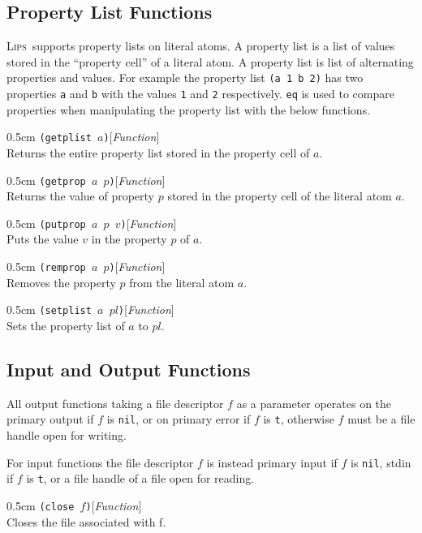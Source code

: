 \documentclass[a4paper]{article}
\newcommand{\lips}{\textsc{Lips}}
\newcommand{\lisp}[1]{\texttt{#1}}
\newcommand{\T}{\lisp{t}}
\newcommand{\NIL}{\lisp{nil}}
\newenvironment{defun}[2]{\begin{adjustwidth}{0.5cm}{}
    {\hspace*{-0.5cm}\lisp{#2}\hfill[\textit{#1}]\\}}
               {\end{adjustwidth}}
\begin{document}
\subsection{Property List Functions}
\lips\ supports property lists on literal atoms. A property list is a
list of values stored in the ``property cell'' of a literal atom. A
property list is list of alternating properties and values. For
example the property list \lisp{(a 1 b 2)} has two properties \lisp{a}
and \lisp{b} with the values \lisp{1} and \lisp{2}
respectively. \lisp{eq} is used to compare properties when
manipulating the property list with the below functions.

\begin{defun}{Function}{(getplist $a$)}
  Returns the entire property list stored in the property cell of $a$.
\end{defun}


\begin{defun}{Function}{(getprop $a$ $p$)}
  Returns the value of property $p$ stored in the property cell of the
  literal atom $a$.
\end{defun}

\begin{defun}{Function}{(putprop $a$ $p$ $v$)}
  Puts the value $v$ in the property $p$ of $a$.
\end{defun}

\begin{defun}{Function}{(remprop $a$ $p$)}
  Removes the property $p$ from the literal atom $a$.
\end{defun}

\begin{defun}{Function}{(setplist $a$ $pl$)}
  Sets the property list of $a$ to $pl$.
\end{defun}

\subsection{Input and Output Functions}
All output functions taking a file descriptor $f$ as a parameter
operates on the primary output if $f$ is \NIL, or on primary error if
$f$ is \T, otherwise $f$ must be a file handle open for writing.

For input functions the file descriptor $f$ is instead primary input
if $f$ is \NIL, stdin if $f$ is \T, or a file handle of a file open
for reading.

\begin{defun}{Function}{(close $f$)}
  Closes the file associated with f.
\end{defun}
\end{document}
